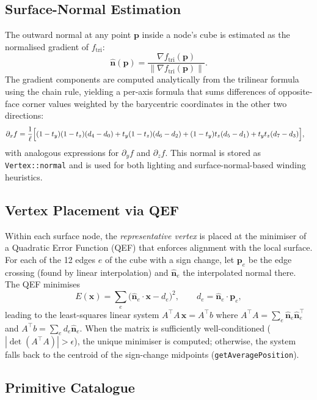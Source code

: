 \documentclass[10pt,a4paper]{article}
\begin{document}
\subsection{Surface-Normal Estimation}
\label{sec:sdf:normal}

The outward normal at any point $\mathbf{p}$ inside a node's cube is
estimated as the normalised gradient of $f_{\text{tri}}$:
\[
  \hat{\mathbf{n}}(\mathbf{p}) =
    \frac{\nabla f_{\text{tri}}(\mathbf{p})}
         {\|\nabla f_{\text{tri}}(\mathbf{p})\|}.
\]
The gradient components are computed analytically from the trilinear
formula using the chain rule, yielding a per-axis formula that sums
differences of opposite-face corner values weighted by the barycentric
coordinates in the other two directions:
\begin{align*}
  \partial_x f &= \frac{1}{\ell}\Bigl[
    (1-t_y)(1-t_z)(d_4-d_0) + t_y(1-t_z)(d_6-d_2) +
    (1-t_y)t_z(d_5-d_1) + t_y t_z(d_7-d_3)
  \Bigr],
\end{align*}
with analogous expressions for $\partial_y f$ and $\partial_z f$.  This
normal is stored as \lstinline{Vertex::normal} and is used for both
lighting and surface-normal-based winding heuristics.

\subsection{Vertex Placement via QEF}
\label{sec:sdf:qef}

Within each surface node, the \emph{representative vertex} is placed at
the minimiser of a Quadratic Error Function (QEF) that enforces alignment
with the local surface.  For each of the 12 edges $e$ of the cube with a
sign change, let $\mathbf{p}_e$ be the edge crossing (found by linear
interpolation) and $\hat{\mathbf{n}}_e$ the interpolated normal there.
The QEF minimises
\[
  E(\mathbf{x}) = \sum_e \bigl(\hat{\mathbf{n}}_e \cdot \mathbf{x} - d_e\bigr)^2,
  \qquad d_e = \hat{\mathbf{n}}_e \cdot \mathbf{p}_e,
\]
leading to the least-squares linear system $A^\top\!A\,\mathbf{x} = A^\top b$ where
$A^\top\!A = \sum_e \hat{\mathbf{n}}_e\hat{\mathbf{n}}_e^\top$ and
$A^\top b = \sum_e d_e\hat{\mathbf{n}}_e$.  When the matrix is
sufficiently well-conditioned ($|\det(A^\top\!A)| > \epsilon$), the
unique minimiser is computed; otherwise, the system falls back to the
centroid of the sign-change midpoints (\lstinline{getAveragePosition}).

\subsection{Primitive Catalogue}
\end{document}
